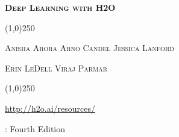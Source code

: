 










\thispagestyle{empty} %


\begin{center}
\textsc{\Large\bf{Deep Learning with H2O}}
\bigskip

\line(1,0){250}  %



\bigskip

\textsc{\small{Anisha Arora \hspace{10pt} Arno Candel \hspace{10pt} Jessica Lanford}}

\textsc{\small{Erin LeDell \hspace{10pt} Viraj Parmar}}


\line(1,0){250}  %

{\url{http://h2o.ai/resources/}}

\normalsize
\bigskip
\monthname \hspace{1pt}  \the\year: Fourth Edition 

\bigskip
\end{center}

